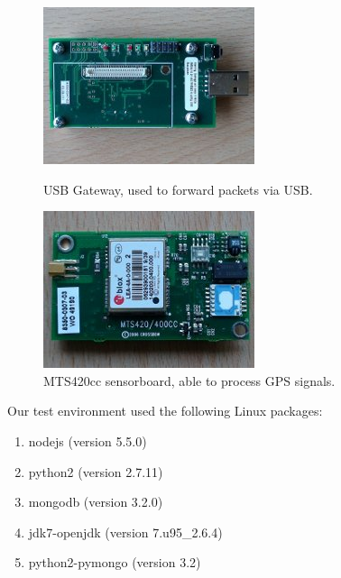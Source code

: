 \documentclass[a4paper]{article}
\newcommand{\mts}{MTS420cc }
\begin{document}
\begin{figure}[h!]

\begin{center}
\begin{minipage}{0.47\textwidth}
\begin{center}
\includegraphics[scale=0.5]{pics/gateway.jpg}
\caption{USB Gateway, used to forward packets via USB.}
\label{fig:gateway}
\end{center}
\end{minipage}
\begin{minipage}{0.06\textwidth}
\end{minipage}
\begin{minipage}{0.47\textwidth}
\begin{center}
\includegraphics[scale=0.5]{pics/420cc.jpg}
\caption{\mts sensorboard, able to process GPS signals.}
\label{fig:420cc}
\end{center}
\end{minipage}

\end{center}

\end{figure}

Our test environment used the following Linux packages:
\begin{enumerate}
\item nodejs (version 5.5.0)
\item python2 (version 2.7.11)
\item mongodb (version 3.2.0)
\item jdk7-openjdk (version 7.u95\_2.6.4)
\item python2-pymongo (version 3.2)

\end{enumerate}
\end{document}
